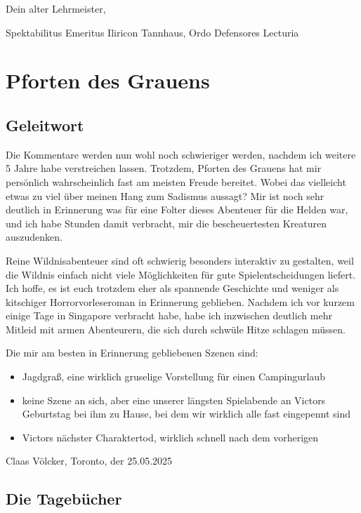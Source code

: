Dein alter Lehrmeister,

Spektabilitus Emeritus Iliricon Tannhaus, Ordo Defensores Lecturia



\chapter{Pforten des Grauens}

\section{Geleitwort}

Die Kommentare werden nun wohl noch schwieriger werden, nachdem ich weitere 5 Jahre habe verstreichen lassen. Trotzdem, Pforten des Grauens hat mir persönlich wahrscheinlich fast am meisten Freude bereitet. Wobei das vielleicht etwas zu viel über meinen Hang zum Sadismus aussagt? Mir ist noch sehr deutlich in Erinnerung was für eine Folter dieses Abenteuer für die Helden war, und ich habe Stunden damit verbracht, mir die bescheuertesten Kreaturen auszudenken.

Reine Wildnisabenteuer sind oft schwierig besonders interaktiv zu gestalten, weil die Wildnis einfach nicht viele Möglichkeiten für gute Spielentscheidungen liefert. Ich hoffe, es ist euch trotzdem eher als spannende Geschichte und weniger als kitschiger Horrorvorleseroman in Erinnerung geblieben. Nachdem ich vor kurzem einige Tage in Singapore verbracht habe, habe ich inzwischen deutlich mehr Mitleid mit armen Abenteurern, die sich durch schwüle Hitze schlagen müssen.

Die mir am besten in Erinnerung gebliebenen Szenen sind:
\begin{itemize}
\item Jagdgraß, eine wirklich gruselige Vorstellung für einen Campingurlaub
\item keine Szene an sich, aber eine unserer längsten Spielabende an Victors Geburtstag bei ihm zu Hause, bei dem wir wirklich alle fast eingepennt sind
\item Victors nächster Charaktertod, wirklich schnell nach dem vorherigen
\end{itemize}


\begin{flushright}
Claas Völcker, Toronto, der 25.05.2025
\end{flushright}


\section{Die Tagebücher}

